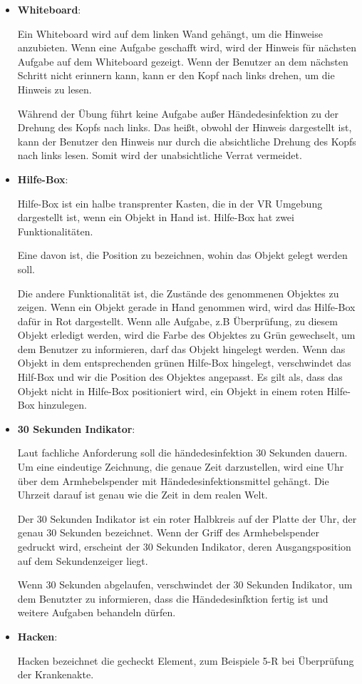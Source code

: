   \begin{itemize}
      \item \textbf{Whiteboard}:
      
      Ein Whiteboard wird auf dem linken Wand gehängt, um die Hinweise anzubieten. Wenn eine Aufgabe geschafft wird, wird der Hinweis für nächsten Aufgabe auf dem Whiteboard gezeigt. Wenn der Benutzer an dem nächsten Schritt nicht erinnern kann, kann er den Kopf nach links drehen, um die Hinweis zu lesen.
      
      Während der Übung führt keine Aufgabe außer Händedesinfektion zu der Drehung des Kopfs nach links. Das heißt, obwohl der Hinweis dargestellt ist, kann der Benutzer den Hinweis nur durch die absichtliche Drehung des Kopfs nach links lesen. Somit wird der unabsichtliche Verrat vermeidet.
      
      \item \textbf{Hilfe-Box}:
      
      Hilfe-Box ist ein halbe transprenter Kasten, die in der VR Umgebung dargestellt ist, wenn ein Objekt in Hand ist. Hilfe-Box hat zwei Funktionalitäten.
      
      Eine davon ist, die Position zu bezeichnen, wohin das Objekt gelegt werden soll.
      
      Die andere Funktionalität ist, die Zustände des genommenen Objektes zu zeigen. Wenn ein Objekt gerade in Hand genommen wird, wird das Hilfe-Box dafür in Rot dargestellt. Wenn alle Aufgabe, z.B Überprüfung, zu diesem Objekt erledigt werden,  wird die Farbe des Objektes zu Grün gewechselt, um dem Benutzer zu informieren, darf das Objekt hingelegt werden. Wenn das Objekt in dem entsprechenden grünen Hilfe-Box hingelegt, verschwindet das Hilf-Box und wir die Position des Objektes angepasst. Es gilt als, dass das Objekt nicht in Hilfe-Box positioniert wird, ein Objekt in einem roten Hilfe-Box hinzulegen.
      
      \item \textbf{30 Sekunden Indikator}:
      
      Laut fachliche Anforderung soll die händedesinfektion 30 Sekunden dauern. Um eine eindeutige Zeichnung, die genaue Zeit darzustellen, wird eine Uhr über dem Armhebelspender mit Händedesinfektionsmittel gehängt. Die Uhrzeit darauf ist genau wie die Zeit in dem realen Welt.
      
      Der 30 Sekunden Indikator ist ein roter Halbkreis auf der Platte der Uhr, der genau 30 Sekunden bezeichnet. Wenn der Griff des Armhebelspender gedruckt wird, erscheint der 30 Sekunden Indikator, deren Ausgangsposition auf dem Sekundenzeiger liegt.
      
      Wenn 30 Sekunden abgelaufen, verschwindet der 30 Sekunden Indikator, um dem Benutzter zu informieren, dass die Händedesinfktion fertig ist und weitere Aufgaben behandeln dürfen.
      
      \item \textbf{Hacken}:
      
      Hacken bezeichnet die gecheckt Element, zum Beispiele 5-R bei Überprüfung der Krankenakte.
  \end{itemize}
  
